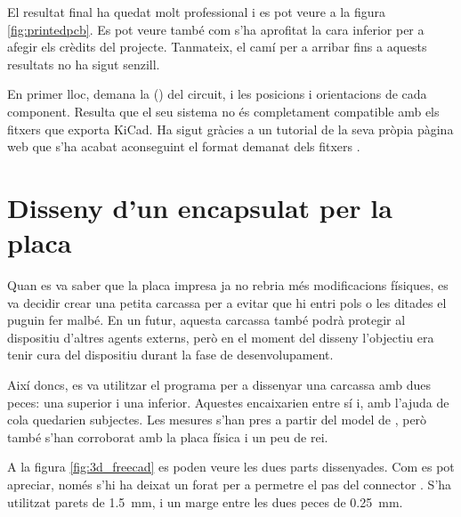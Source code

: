 El resultat final ha quedat molt professional i es pot veure a la figura
\ref{fig:printedpcb}. Es pot veure també com s'ha aprofitat la cara inferior
per a afegir els crèdits del projecte. Tanmateix, el camí per a arribar fins
a aquests resultats no ha sigut senzill.

En primer lloc,  demana la  ()
del circuit, i les posicions i orientacions de cada component. Resulta que el
seu sistema no és completament compatible amb els fitxers que exporta
KiCad. Ha sigut gràcies a un tutorial de la seva pròpia pàgina web que s'ha
acabat aconseguint el format demanat dels fitxers \cite{KiCADJLC}.

\section{Disseny d'un encapsulat per la placa}

Quan es va saber que la placa impresa ja no rebria més modificacions físiques,
es va decidir crear una petita carcassa per a evitar que hi entri pols o les
ditades el puguin fer malbé. En un futur, aquesta carcassa també podrà protegir
al dispositiu d'altres agents externs, però en el moment del disseny l'objectiu
era tenir cura del dispositiu durant la fase de desenvolupament.

Així doncs, es va utilitzar el programa  per a dissenyar una
carcassa amb dues peces: una superior i una inferior. Aquestes encaixarien entre
sí i, amb l'ajuda de cola quedarien subjectes. Les mesures s'han pres a partir
del model de , però també s'han corroborat amb la placa física i un
peu de rei.

A la figura \ref{fig:3d_freecad} es poden veure les dues parts dissenyades. Com es pot
apreciar, només s'hi ha deixat un forat per a permetre el pas del connector
. S'ha utilitzat parets de \SI{1.5}{\milli\meter}, i un marge entre
les dues peces de \SI{0.25}{\milli\meter}.

